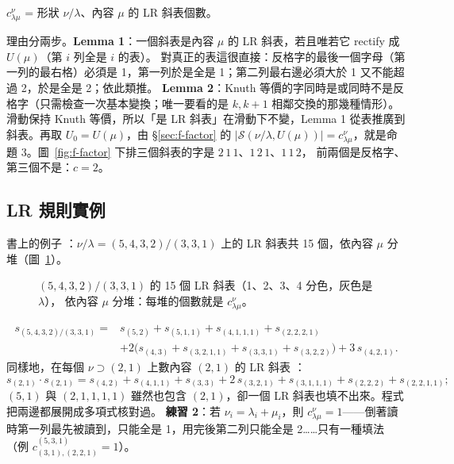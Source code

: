 \begin{thmbox}[命題 3 \fulref{p.64}]
$c^\nu_{\lambda\mu}$ = 形狀 $\nu/\lambda$、內容 $\mu$ 的 LR 斜表個數。
\end{thmbox}

理由分兩步。\textbf{Lemma 1}：一個斜表是內容 $\mu$ 的 LR 斜表，若且唯若它 rectify 成 $U(\mu)$（第 $i$ 列全是 $i$ 的表）。
對真正的表這很直接：反格字的最後一個字母（第一列的最右格）必須是 1，第一列於是全是 1；第二列最右邊必須大於 1 又不能超過 2，於是全是 2；依此類推。
\textbf{Lemma 2}：Knuth 等價的字同時是或同時不是反格字（只需檢查一次基本變換；唯一要看的是 $k,k{+}1$ 相鄰交換的那幾種情形）。
滑動保持 Knuth 等價，所以「是 LR 斜表」在滑動下不變，Lemma 1 從表推廣到斜表。再取 $U_0=U(\mu)$，由 \S\ref{sec:f-factor} 的
$|\mathcal S(\nu/\lambda,U(\mu))|=c^\nu_{\lambda\mu}$，就是命題 3。圖~\ref{fig:f-factor} 下排三個斜表的字是 $2\,1\,1$、$1\,2\,1$、$1\,1\,2$，
前兩個是反格字、第三個不是：$c=2$。

\subsection{LR 規則實例}\label{sec:f-lrrule}

書上的例子 ：$\nu/\lambda=(5,4,3,2)/(3,3,1)$ 上的 LR 斜表共 15 個，依內容 $\mu$ 分堆（圖~\ref{fig:f-lrall}）。

\begin{figure}[H]
\centering
\FulLRAll
\caption{$(5,4,3,2)/(3,3,1)$ 的 15 個 LR 斜表（\textcolor{cLeft}{1}、\textcolor{cB}{2}、\textcolor{cRight}{3}、\textcolor{cC}{4} 分色，灰色是 $\lambda$），
依內容 $\mu$ 分堆：每堆的個數就是 $c^\nu_{\lambda\mu}$。}
\label{fig:f-lrall}
\end{figure}

\[
\begin{aligned}
s_{(5,4,3,2)/(3,3,1)}={}&s_{(5,2)}+s_{(5,1,1)}+s_{(4,1,1,1)}+s_{(2,2,2,1)}\\
&+2\bigl(s_{(4,3)}+s_{(3,2,1,1)}+s_{(3,3,1)}+s_{(3,2,2)}\bigr)+3\,s_{(4,2,1)} .
\end{aligned}
\]
同樣地，在每個 $\nu\supset(2,1)$ 上數內容 $(2,1)$ 的 LR 斜表 ：
\[
s_{(2,1)}\cdot s_{(2,1)}=s_{(4,2)}+s_{(4,1,1)}+s_{(3,3)}+2\,s_{(3,2,1)}+s_{(3,1,1,1)}+s_{(2,2,2)}+s_{(2,2,1,1)} ;
\]
$(5,1)$ 與 $(2,1,1,1,1)$ 雖然也包含 $(2,1)$，卻一個 LR 斜表也填不出來。程式把兩邊都展開成多項式核對過。
\textbf{練習 2}：若 $\nu_i=\lambda_i+\mu_i$，則 $c^\nu_{\lambda\mu}=1$——倒著讀時第一列最先被讀到，只能全是 1，用完後第二列只能全是 2……只有一種填法
（例 $c^{(5,3,1)}_{(3,1),(2,2,1)}=1$）。

